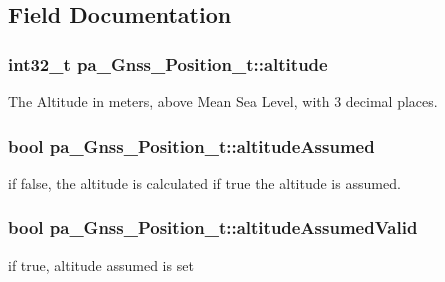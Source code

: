 \subsection{Field Documentation}
\subsubsection[{\texorpdfstring{altitude}{altitude}}]{\setlength{\rightskip}{0pt plus 5cm}int32\+\_\+t pa\+\_\+\+Gnss\+\_\+\+Position\+\_\+t\+::altitude}\hypertarget{structpa___gnss___position__t_af293383355913327eaaa6d3b4ef9fb22}{}\label{structpa___gnss___position__t_af293383355913327eaaa6d3b4ef9fb22}
The Altitude in meters, above Mean Sea Level, with 3 decimal places. 
\subsubsection[{\texorpdfstring{altitude\+Assumed}{altitudeAssumed}}]{\setlength{\rightskip}{0pt plus 5cm}bool pa\+\_\+\+Gnss\+\_\+\+Position\+\_\+t\+::altitude\+Assumed}\hypertarget{structpa___gnss___position__t_a76da9a49fe7f965eadb7091c69dc22ec}{}\label{structpa___gnss___position__t_a76da9a49fe7f965eadb7091c69dc22ec}
if false, the altitude is calculated if true the altitude is assumed. 
\subsubsection[{\texorpdfstring{altitude\+Assumed\+Valid}{altitudeAssumedValid}}]{\setlength{\rightskip}{0pt plus 5cm}bool pa\+\_\+\+Gnss\+\_\+\+Position\+\_\+t\+::altitude\+Assumed\+Valid}\hypertarget{structpa___gnss___position__t_a932196f94844d8c94c66dd8affd7c618}{}\label{structpa___gnss___position__t_a932196f94844d8c94c66dd8affd7c618}


if true, altitude assumed is set 

